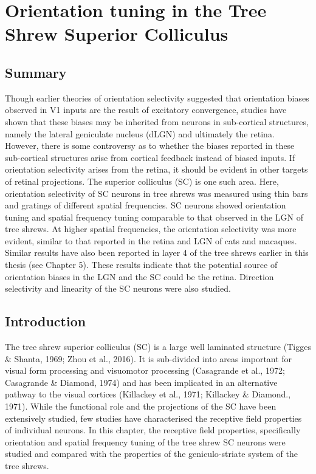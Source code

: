 

	\chapter [Orientation tuning in Superior Colliculus]{Orientation tuning in the Tree Shrew Superior Colliculus}

	\pagebreak
	\section{Summary}
	
	Though earlier theories of orientation selectivity suggested that orientation biases observed in V1 inputs are the result of excitatory convergence, studies have shown that these biases may be inherited from neurons in sub-cortical structures, namely the lateral geniculate nucleus (dLGN) and ultimately the retina. However, there is some controversy as to whether the biases reported in these sub-cortical structures arise from cortical feedback instead of biased inputs. If orientation selectivity arises from the retina, it should be evident in other targets of retinal projections. The superior colliculus (SC) is one such area. Here, orientation selectivity of SC neurons in tree shrews was measured using thin bars and gratings of different spatial frequencies. SC neurons showed orientation tuning and spatial frequency tuning comparable to that observed in the LGN of tree shrews. At higher spatial frequencies, the orientation selectivity was more evident, similar to that reported in the retina and LGN of cats and macaques. Similar results have also been reported in layer 4 of the tree shrews earlier in this thesis (see Chapter 5). These results indicate that the potential source of orientation biases in the LGN and the SC could be the retina. Direction selectivity and linearity of the SC neurons were also studied.
	
	\pagebreak
	
	
	\section{Introduction}
	
The tree shrew superior colliculus (SC) is a large well laminated structure (Tigges \& Shanta, 1969; Zhou et al., 2016). It is sub-divided into areas important for visual form processing and visuomotor processing (Casagrande et al., 1972; Casagrande \& Diamond, 1974) and has been implicated in an alternative pathway to the visual cortices (Killackey et al., 1971; Killackey \& Diamond., 1971). While the functional role and the projections of the SC have been extensively studied, few studies have characterised the receptive field properties of individual neurons. In this chapter, the receptive field properties, specifically orientation and spatial frequency tuning of the tree shrew SC neurons were studied and compared with the properties of the geniculo-striate system of the tree shrews.
 

